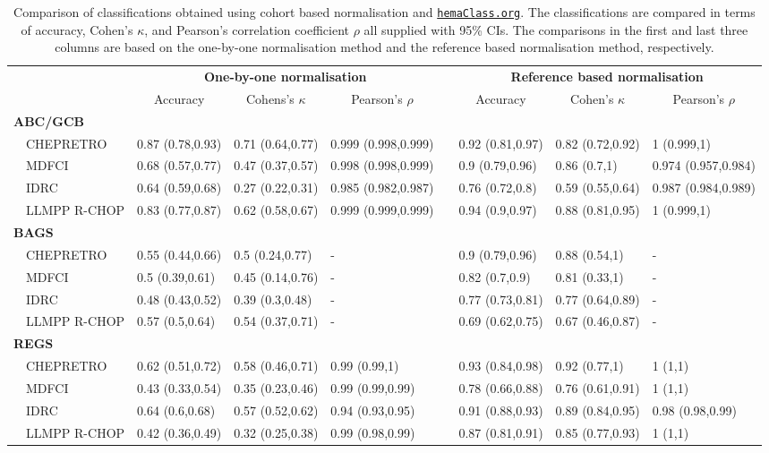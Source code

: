 \documentclass{article}
\newcommand{\hemaClass}{\href{http://hemaClass.org}{\texttt{hemaClass.org}}}
\begin{document}
\begin{table}[!tbp]
\scriptsize
\tabcolsep=0.11cm
\caption{Comparison of classifications obtained using cohort based normalisation and \hemaClass{}.
The classifications are compared in terms of accuracy, Cohen's $\kappa$, and Pearson's correlation coefficient $\rho$ all supplied with 95\% CIs.
The comparisons in the first and last three columns are based on the one-by-one normalisation method and the reference based normalisation method, respectively.\label{tab:classALL}}
\begin{center}
\begin{tabular}{llllclll}
\hline\hline
\multicolumn{1}{l}{\bfseries }&\multicolumn{3}{c}{\bfseries One-by-one normalisation}&\multicolumn{1}{c}{\bfseries }&\multicolumn{3}{c}{\bfseries Reference based normalisation}\tabularnewline
\cline{2-4} \cline{6-8}
\multicolumn{1}{l}{}&\multicolumn{1}{c}{Accuracy}&\multicolumn{1}{c}{Cohens's $\kappa$}&\multicolumn{1}{c}{Pearson's $\rho$}&\multicolumn{1}{c}{}&\multicolumn{1}{c}{Accuracy}&\multicolumn{1}{c}{Cohen's $\kappa$}&\multicolumn{1}{c}{Pearson's $\rho$}\tabularnewline
\hline
{\bfseries ABC/GCB}&&&&&&&\tabularnewline
~~CHEPRETRO&0.87 (0.78,0.93)&0.71 (0.64,0.77)&0.999 (0.998,0.999)&&0.92 (0.81,0.97)&0.82 (0.72,0.92)&1 (0.999,1)\tabularnewline
~~MDFCI&0.68 (0.57,0.77)&0.47 (0.37,0.57)&0.998 (0.998,0.999)&&0.9 (0.79,0.96)&0.86 (0.7,1)&0.974 (0.957,0.984)\tabularnewline
~~IDRC&0.64 (0.59,0.68)&0.27 (0.22,0.31)&0.985 (0.982,0.987)&&0.76 (0.72,0.8)&0.59 (0.55,0.64)&0.987 (0.984,0.989)\tabularnewline
~~LLMPP R-CHOP&0.83 (0.77,0.87)&0.62 (0.58,0.67)&0.999 (0.999,0.999)&&0.94 (0.9,0.97)&0.88 (0.81,0.95)&1 (0.999,1)\tabularnewline
\hline
{\bfseries BAGS}&&&&&&&\tabularnewline
~~CHEPRETRO&0.55 (0.44,0.66)&0.5 (0.24,0.77)&-&&0.9 (0.79,0.96)&0.88 (0.54,1)&-\tabularnewline
~~MDFCI&0.5 (0.39,0.61)&0.45 (0.14,0.76)&-&&0.82 (0.7,0.9)&0.81 (0.33,1)&-\tabularnewline
~~IDRC&0.48 (0.43,0.52)&0.39 (0.3,0.48)&-&&0.77 (0.73,0.81)&0.77 (0.64,0.89)&-\tabularnewline
~~LLMPP R-CHOP&0.57 (0.5,0.64)&0.54 (0.37,0.71)&-&&0.69 (0.62,0.75)&0.67 (0.46,0.87)&-\tabularnewline
\hline
{\bfseries REGS}&&&&&&&\tabularnewline
~~CHEPRETRO&0.62 (0.51,0.72)&0.58 (0.46,0.71)&0.99 (0.99,1)&&0.93 (0.84,0.98)&0.92 (0.77,1)&1 (1,1)\tabularnewline
~~MDFCI&0.43 (0.33,0.54)&0.35 (0.23,0.46)&0.99 (0.99,0.99)&&0.78 (0.66,0.88)&0.76 (0.61,0.91)&1 (1,1)\tabularnewline
~~IDRC&0.64 (0.6,0.68)&0.57 (0.52,0.62)&0.94 (0.93,0.95)&&0.91 (0.88,0.93)&0.89 (0.84,0.95)&0.98 (0.98,0.99)\tabularnewline
~~LLMPP R-CHOP&0.42 (0.36,0.49)&0.32 (0.25,0.38)&0.99 (0.98,0.99)&&0.87 (0.81,0.91)&0.85 (0.77,0.93)&1 (1,1)\tabularnewline
\hline
\end{tabular}
\end{center}
\end{table}
\end{document}
